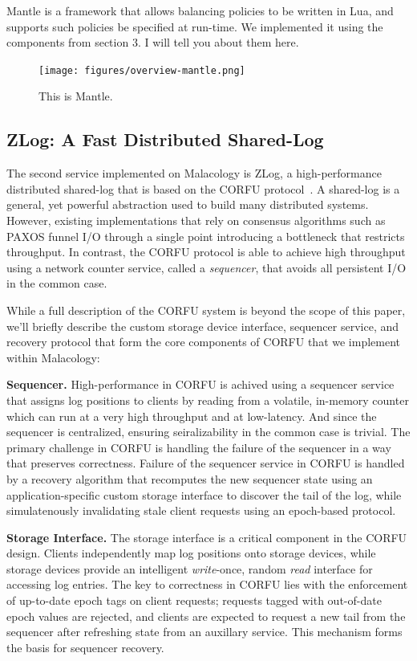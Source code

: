 \documentclass[10pt,twocolumn]{article}
\begin{document}
Mantle is a framework that allows balancing policies to be written in Lua,
and supports such policies be specified at run-time.
We implemented it using the components from section 3. I will tell you about them here.


\begin{figure}[htbp]
\centering
\texttt{[image: figures/overview-mantle.png]}
\caption{This is Mantle.}
\end{figure}

\subsection{ZLog: A Fast Distributed Shared-Log}

The second service implemented on Malacology is ZLog, a high-performance
distributed shared-log that is based on the CORFU
protocol~\cite{balakrishnan_corfu_2012}. A
shared-log is a general, yet powerful abstraction used to build many
distributed systems. However, existing implementations that rely on consensus
algorithms such as PAXOS funnel I/O through a single point introducing a
bottleneck that restricts throughput. In contrast, the CORFU protocol is able
to achieve high throughput using a network counter service, called a 
\emph{sequencer}, that avoids all persistent I/O in the common case.

While a full description of the CORFU system is beyond the scope of this
paper, we'll briefly describe the custom storage device interface, sequencer
service, and recovery protocol that form the core components of CORFU that we
implement within Malacology:

{\bf Sequencer.}
High-performance in CORFU is achived using a sequencer service that assigns
log positions to clients by reading from a volatile, in-memory counter which
can run at a very high throughput and at low-latency. And since the sequencer
is centralized, ensuring seiralizability in the common case is trivial.  The
primary challenge in CORFU is handling the failure of the sequencer in a way
that preserves correctness. Failure of the sequencer service in CORFU is
handled by a recovery algorithm that recomputes the new sequencer state using
an application-specific custom storage interface to discover the tail of the
log, while simulatenously invalidating stale client requests using an
epoch-based protocol.

{\bf Storage Interface.} The storage interface is a critical component in the
CORFU design. Clients independently map log positions onto storage devices,
while storage devices provide an intelligent \emph{write}-once, random
\emph{read} interface for accessing log entries. The key to correctness in
CORFU lies with the enforcement of up-to-date epoch tags on client requests;
requests tagged with out-of-date epoch values are rejected, and clients are
expected to request a new tail from the sequencer after refreshing state from
an auxillary service. This mechanism forms the basis for sequencer recovery.
\end{document}
